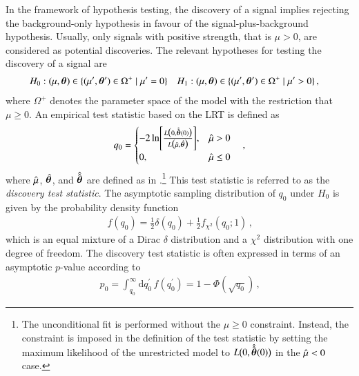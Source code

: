 In the framework of hypothesis testing, the discovery of a signal implies
rejecting the background-only hypothesis in favour of the signal-plus-background
hypothesis. Usually, only signals with positive strength, that is $\mu > 0$, are
considered as potential discoveries. The relevant hypotheses for testing the
discovery of a signal are
\begin{align*}
  &H_0: (\mu, \bm{\theta}) \in \{ (\mu^\prime, \bm{\theta}^\prime) \in \Omega^+ \mid \mu^\prime = 0 \}
  &&H_1: (\mu, \bm{\theta}) \in \{ (\mu^\prime, \bm{\theta}^\prime) \in \Omega^+ \mid \mu^\prime > 0 \} \,\text{,}
\end{align*}
where $\Omega^+$ denotes the parameter space of the model with the restriction
that $\mu \geq 0$. An empirical test statistic based on the LRT is defined
as~\cite{Cowan:2010js}
\begin{align}
  q_0 = \begin{cases}
          -2 \ln\mathopen{}\left[ \frac{ L\bigl(0, \hat{\hat{\bm{\theta}}}(0) \bigr)}{L\bigl( \hat{\mu}, \hat{\bm{\theta}} \bigr)} \right]\mathclose{}, & \hat{\mu} > 0 \\
          0,          & \hat{\mu} \leq 0
        \end{cases} \quad\text{,}
  \label{eq:discovery_teststat}
\end{align}
where $\hat{\mu}$, $\hat{\bm{\theta}}$, and $\hat{\hat{\bm{\theta}}}$ are
defined as in .\footnote{The
  unconditional fit is performed without the $\mu \geq 0$ constraint. Instead,
  the constraint is imposed in the definition of the test statistic by setting
  the maximum likelihood of the unrestricted model to
  $L\bigl( 0, \hat{\hat{\bm{\theta}}}(0) \bigr)$ in the $\hat{\mu} < 0$ case.}
This test statistic is referred to as the \emph{discovery test statistic}. The
asymptotic sampling distribution of $q_0$ under $H_0$ is given by the
probability density function~\cite{Cowan:2010js}
\begin{align*}
  f(q_0) = \frac{1}{2} \delta(q_0) + \frac{1}{2} f_{\chi^2}(q_0; 1) \,\text{,}
\end{align*}
which is an equal mixture of a Dirac $\delta$ distribution and a $\chi^2$
distribution with one degree of freedom. The discovery test statistic is often
expressed in terms of an asymptotic $p$-value according to~\cite{Cowan:2010js}
\begin{align*}
  p_0 = \int_{q_{0}}^\infty \mathrm{d}q_0^\prime \, f(q_0^\prime) =
  1 - \Phi\left(\sqrt{q_{0}}\right) \,\text{,}
\end{align*}
